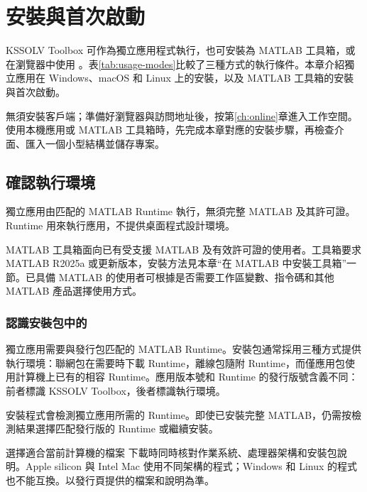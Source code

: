 \chapter{安裝與首次啟動}\label{ch:install}

KSSOLV Toolbox 可作為獨立應用程式執行，也可安裝為 MATLAB\regmark{} 工具箱，或在瀏覽器中使用 \ksonline{}。表\ref{tab:usage-modes}比較了三種方式的執行條件。本章介紹獨立應用在 Windows、macOS 和 Linux 上的安裝，以及 MATLAB\regmark{} 工具箱的安裝與首次啟動。

\ksonline{} 無須安裝客戶端；準備好瀏覽器與訪問地址後，按第\ref{ch:online}章進入工作空間。使用本機應用或 MATLAB\regmark{} 工具箱時，先完成本章對應的安裝步驟，再檢查介面、匯入一個小型結構並儲存專案。

\section{確認執行環境}

獨立應用由匹配的 MATLAB\regmark{} Runtime 執行，無須完整 MATLAB\regmark{} 及其許可證。Runtime 用來執行應用，不提供桌面程式設計環境。

MATLAB\regmark{} 工具箱面向已有受支援 MATLAB\regmark{} 及有效許可證的使用者。工具箱要求 MATLAB\regmark{} R2025a 或更新版本，安裝方法見本章“在 MATLAB\regmark{} 中安裝工具箱”一節。已具備 MATLAB\regmark{} 的使用者可根據是否需要工作區變數、指令碼和其他 MATLAB\regmark{} 產品選擇使用方式。

\subsection{認識安裝包中的 }

獨立應用需要與發行包匹配的 MATLAB\regmark{} Runtime。安裝包通常採用三種方式提供執行環境：聯網包在需要時下載 Runtime，離線包隨附 Runtime，而僅應用包使用計算機上已有的相容 Runtime。應用版本號和 Runtime 的發行版號含義不同：前者標識 KSSOLV Toolbox，後者標識執行環境。

安裝程式會檢測獨立應用所需的 Runtime。即使已安裝完整 MATLAB\regmark{}，仍需按檢測結果選擇匹配發行版的 Runtime 或繼續安裝。

\begin{notebox}{選擇適合當前計算機的檔案}
下載時同時核對作業系統、處理器架構和安裝包說明。Apple silicon 與 Intel Mac 使用不同架構的程式；Windows 和 Linux 的程式也不能互換。以發行頁提供的檔案和說明為準。
\end{notebox}

